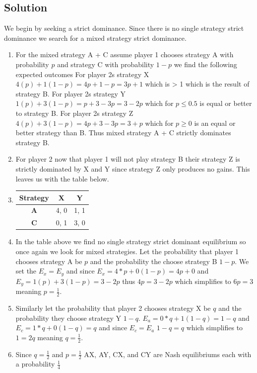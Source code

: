 \documentclass[11pt]{article}
\begin{document}
\begin{enumerate}
\begin{enumerate}
\subsection{Solution}
We begin by seeking a strict dominance. Since there is no single strategy strict dominance we search for a mixed strategy strict dominance.
\begin{enumerate}
    \item For the mixed strategy A + C assume player 1 chooses strategy A with probability $p$ and strategy C with probability $1-p$ we find the following expected outcomes For player 2s strategy X $4(p) + 1(1-p)= 4p +1 -p = 3p +1$ which is > 1 which is the result of strategy B. For player 2s strategy Y $1(p) + 3(1-p) = p + 3 - 3p = 3 - 2p$ which for $p \le 0.5$ is equal or better to strategy B. For player 2s strategy Z $4(p) + 3(1-p) = 4p+3-3p=3+p$ which for $p \ge 0$ is an equal or better strategy than B. Thus mixed strategy A + C strictly dominates strategy B.
    \item For player 2 now that player 1 will not play strategy B their strategy Z is strictly dominated by X and Y since strategy Z only produces no gains. This leaves us with the table below. 
    \item
    \begin{tabular}{| c | c | c |}
    \hline
    \textbf{Strategy} & \textbf{X} & \textbf{Y} \\ \hline \hline
    \textbf{A} & 4, 0 & 1, 1 \\ \hline
    \textbf{C} & 0, 1 & 3, 0 \\ \hline
    \end{tabular}
    \item In the table above we find no single strategy strict dominant equilibrium so once again we look for mixed strategies. Let the probability that player 1 chooses strategy  A be $p$ and the probability the choose strategy B $1-p$. We set the $E_x = E_y$ and since $E_x = 4*p + 0(1-p) = 4p + 0$ and $E_y = 1(p) + 3(1-p) = 3 - 2p$ thus $4p = 3 - 2p$ which simplifies to $6p = 3$ meaning $p=\frac{1}{2}$.
    \item Similarly let the probability that player 2 chooses strategy X be $q$ and the probability they choose strategy Y $1-q$. $E_a = 0*q + 1(1-q) = 1 -q$ and $E_c = 1*q + 0(1-q) = q$ and since $E_c = E_a$ $1 - q = q$ which simplifies to $1 = 2q$ meaning $q = \frac{1}{2}$. 
    \item Since $q = \frac{1}{2}$ and $p = \frac{1}{2}$ AX, AY, CX, and CY are Nash equilibriums each with a probability $\frac{1}{4}$
\end{enumerate} 


\end{enumerate}
\end{enumerate}
\end{document}
